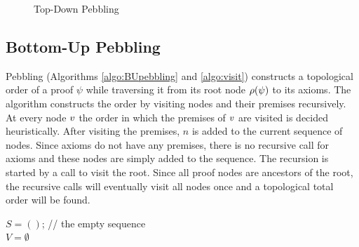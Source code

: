 \documentclass{llncs}
\newcommand{\nodedistance}{0.55cm}
\begin{document}
\begin{example}
\begin{figure}[h]
{\begin{minipage}{.33\textwidth}
	\end{minipage}%
	}
	\caption{Top-Down Pebbling}
	\label{fig:TDP}
\end{figure}
\label{example:TDPIssue}
\end{example}


\subsection{Bottom-Up Pebbling}

 Pebbling (Algorithms \ref{algo:BUpebbling} and \ref{algo:visit}) constructs a topological order of a proof $\psi$ while traversing it from its root node $\rho(\psi)$ to its axioms. The algorithm constructs the order by visiting nodes and their premises recursively. At every node $v$ the order in which the premises of $v$ are visited is decided heuristically. After visiting the premises, $n$ is added to the current sequence of nodes.
Since axioms do not have any premises, there is no recursive call for axioms and these nodes are simply added to the sequence. The recursion is started by a call to visit the root.
Since all proof nodes are ancestors of the root, the recursive calls will eventually visit all nodes once and a topological total order will be found.



\begin{algorithm}[h]
  \BlankLine

	$S = ()$; // the empty sequence \\
	$V = \emptyset$\;
	\Return {}\;

  \caption[.]{}
  \label{algo:BUpebbling}
\end{algorithm}
\end{document}
